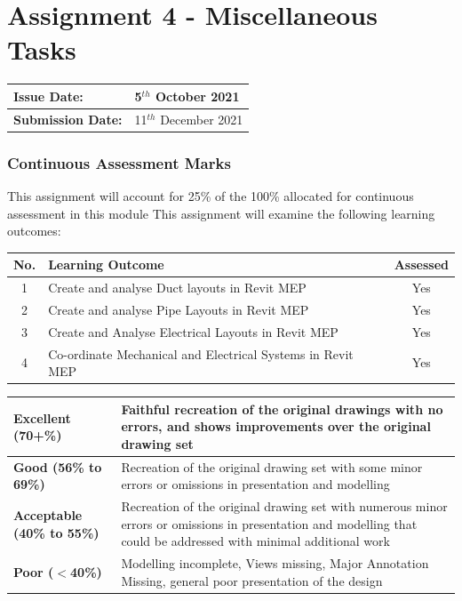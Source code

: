 
	
\part*{Assignment 4 - Miscellaneous Tasks}

\begin{tabularx}{\textwidth}{ |X|X| }
	\hline
	\textbf{Issue Date:} & 5$^{th}$ October 2021\\
	\hline 
	\textbf{Submission Date:}  & 11$^{th}$ December 2021\\
	\hline
\end{tabularx}

\section*{Continuous Assessment Marks}
This assignment will account for 25\% of the 100\% allocated for continuous assessment in this module
This assignment will examine the following learning outcomes:\\

\begin{tabularx}{\textwidth}{ |c|X|c| }
	\hline
	\textbf{No.} & \textbf{Learning Outcome} & \textbf{Assessed} \\
	\hline 
	1  & Create and analyse Duct layouts in Revit MEP & Yes \\
	2  & Create and analyse Pipe Layouts in Revit MEP & Yes \\
	3  & Create and Analyse Electrical Layouts in Revit MEP & Yes \\
	4  & Co-ordinate Mechanical and Electrical Systems in Revit MEP & Yes \\
	\hline
\end{tabularx}

\vspace{1cm}

\begin{tabularx}{\textwidth}{ |l|X| }
	\hline 
	\textbf{Excellent (70+\%)} & Faithful recreation of the original drawings with no errors, and shows improvements over the original drawing set\\ 
	\hline
	\textbf{Good (56\% to 69\%)} & Recreation of the original drawing set with some minor errors or omissions in presentation and modelling \\
	\hline
	\textbf{Acceptable (40\% to 55\%)} & Recreation of the original drawing set with numerous minor errors or omissions in presentation and modelling that could be addressed with minimal additional work \\ 
	\hline
	\textbf{Poor ($<$40\%)} & Modelling incomplete, Views missing, Major Annotation Missing, general poor presentation of the design  \\
	\hline
\end{tabularx}





